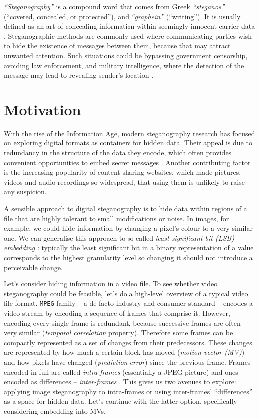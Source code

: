 \documentclass[12pt,british,twoside,notitlepage,usenames,dvipsnames,hypens,final]{report}
\numberwithin{equation}{section}
\numberwithin{figure}{section}
\begin{document}
\emph{``Steganography''} is a compound word that comes from Greek \emph{``steganos''} (``covered, concealed, or protected''), and \emph{``graphein''} (``writing''). It is usually defined as an art of concealing information within seemingly innocent carrier data \cite[p. 3]{fridrich}. Steganographic methods are commonly used where communicating parties wish to hide the existence of messages between them, because that may attract unwanted attention. Such situations could be bypassing government censorship, avoiding law enforcement, and military intelligence, where the detection of the message may lead to revealing sender's location \cite{infohiding-survey}. 
 
\section{Motivation}

With the rise of the Information Age, modern steganography research has focused on exploring digital formats as containers for hidden data. Their appeal is due to redundancy in the structure of the data they encode, which often provides convenient opportunities to embed secret messages \cite[p. 2]{fridrich}. Another contributing factor is the increasing popularity of content-sharing websites, which made pictures, videos and audio recordings so widespread, that using them is unlikely to raise any suspicion. 

A sensible approach to digital steganography is to hide data within regions of a file that are highly tolerant to small modifications or noise. In images, for example, we could hide information by changing a pixel's colour to a very similar one. We can generalise this approach to so-called \emph{least-significant-bit (LSB) embedding} \cite{bateman}: typically the least significant bit in a binary representation of a value corresponds to the highest granularity level so changing it should not introduce a perceivable change.

Let's consider hiding information in a video file. To see whether video steganography could be feasible, let's do a high-level overview of a typical video file format. \texttt{MPEG} family -- a de facto industry and consumer standard -- encodes a video stream by encoding a sequence of frames that comprise it. However, encoding every single frame is redundant, because successive frames are often very similar (\emph{temporal correlation} property). Therefore some frames can be compactly represented as a set of changes from their predecessors. These changes are represented by how much a certain block has moved (\emph{motion vector (MV)}) and how pixels have changed (\emph{prediction error}) since the previous frame.  Frames encoded in full are called \emph{intra-frames} \cite{h264-std} (essentially a JPEG picture) and ones encoded as differences -- \emph{inter-frames} \cite{h264-std}. This gives us two avenues to explore: applying image steganography to intra-frames or using inter-frames' ``differences'' as a space for hidden data. Let's continue with the latter option, specifically considering embedding into MVs.
\end{document}

